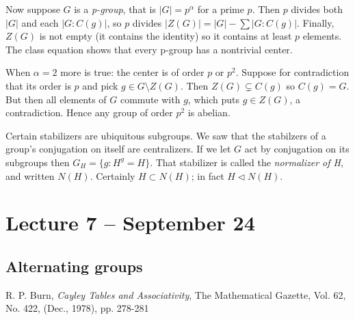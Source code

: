 \documentclass[letterpaper]{article}
\begin{document}
Now suppose $G$ is a \emph{p-group}, that is $|G| = p^\alpha$ for a prime $p$. Then $p$ divides both $|G|$ and each $|G \colon C(g)|$, so $p$ divides $|Z(G)| = |G| - \sum |G \colon C(g)|$. Finally, $Z(G)$ is not empty (it contains the identity) so it contains at least $p$ elements. The class equation shows that every p-group has a nontrivial center.

When $\alpha = 2$ more is true: the center is of order $p$ or $p^2$. Suppose for contradiction that its order is $p$ and pick $g \in G \setminus Z(G)$. Then $Z(G) \subsetneq C(g)$ so $C(g) = G$. But then all elements of $G$ commute with $g$, which puts $g \in Z(G)$, a contradiction. Hence any group of order $p^2$ is abelian.

Certain stabilizers are ubiquitous subgroups. We saw that the stabilzers of a group's conjugation on itself are centralizers. If we let $G$ act by conjugation on its subgroups then $G_H = \{g\colon H^g = H\}$. That stabilizer is called the \emph{normalizer of H}, and written $N(H)$. Certainly $H \subset N(H)$; in fact $H \lhd N(H)$.

\section{Lecture 7 -- September 24}

\subsection{Alternating groups}


\begin{thebibliography}{7}
 R. P. Burn, \emph{Cayley Tables and Associativity},
The Mathematical Gazette, Vol. 62, No. 422, (Dec., 1978), pp. 278-281
\end{thebibliography}
\end{document}
